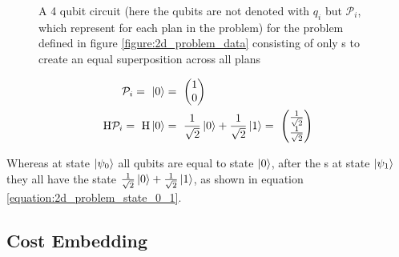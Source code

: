 \begin{figure}[!h]
    \centering
    \caption{A 4 qubit circuit (here the qubits are not denoted with $q_i$ but $\mathcal{P}_i$, which represent for each plan in the problem) for the problem defined in figure \ref{figure:2d_problem_data} consisting of only \hgate s to create an equal superposition across all plans}
    \label{figure:4_qubit_circuit_with_h_gates}
\end{figure}

\begin{equation}
    \centering
    \begin{split}
        \mathcal{P}_i =\ \ket{0} &=\ \begin{pmatrix}1 \\ 0\end{pmatrix}\\
        \mathrm{H}\mathcal{P}_i =\ \mathrm{H}\ket{0} &=\ \frac{1}{\sqrt{2}}\ket{0} + \frac{1}{\sqrt{2}}\ket{1} =\ \begin{pmatrix}\frac{1}{\sqrt{2}} \\ \frac{1}{\sqrt{2}}\end{pmatrix}\\
    \end{split}
    \label{equation:2d_problem_state_0_1}
\end{equation}

Whereas at state $\ket{\psi_0}$ all qubits are equal to state $\ket{0}$, after the \hgate s at state $\ket{\psi_1}$ they all have the state $\frac{1}{\sqrt{2}}\ket{0} + \frac{1}{\sqrt{2}}\ket{1}$, as shown in equation \ref{equation:2d_problem_state_0_1}. 
\subsection{Cost Embedding}

